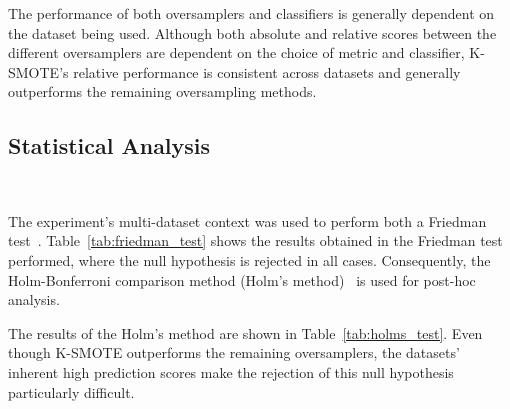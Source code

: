 \documentclass[parskip=full]{scrartcl}
\begin{document}
The performance of both oversamplers and classifiers is generally dependent on
the dataset being used. Although both absolute and relative scores between the
different oversamplers are dependent on the choice of metric and classifier,
K-SMOTE's relative performance is consistent across datasets and generally
outperforms the remaining oversampling methods.


\subsection{Statistical Analysis}~\label{sec:statistical_analysis}

The experiment's multi-dataset context was used to perform both a Friedman
test~\cite{friedman1937use}. Table~\ref{tab:friedman_test} shows the results
obtained in the Friedman test performed, where the null hypothesis is rejected
in all cases. Consequently, the Holm-Bonferroni comparison method (Holm's
method)~\cite{holm1979simple} is used for post-hoc analysis.


The results of the Holm's method are shown in Table~\ref{tab:holms_test}. Even though K-SMOTE
outperforms the remaining oversamplers, the datasets' inherent high prediction scores make the
rejection of this null hypothesis particularly difficult.
\end{document}
